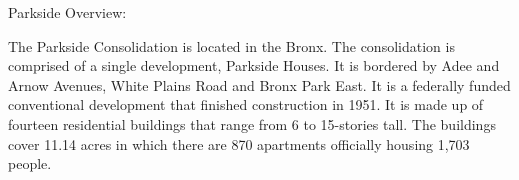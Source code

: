 Parkside Overview:  

   

The Parkside Consolidation is located in the Bronx. The consolidation is comprised of a single development, Parkside Houses. It is bordered by Adee and Arnow Avenues, White Plains Road and Bronx Park East. It is a federally funded conventional development that finished construction in 1951. It is made up of fourteen residential buildings that range from 6 to 15-stories tall. The buildings cover 11.14 acres in which there are 870 apartments officially housing 1,703 people.    